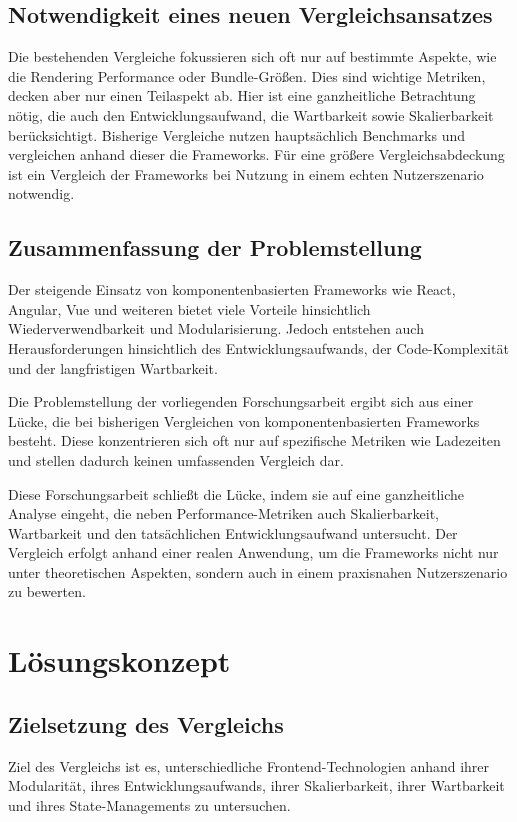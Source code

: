 \documentclass[oneside]{ausarbeitung}
\begin{document}
\section{Notwendigkeit eines neuen Vergleichsansatzes}

Die bestehenden Vergleiche fokussieren sich oft nur auf bestimmte Aspekte, wie die Rendering Performance oder Bundle-Größen. Dies sind wichtige Metriken, decken aber nur einen Teilaspekt ab. Hier ist eine ganzheitliche Betrachtung nötig, die auch den Entwicklungsaufwand, die Wartbarkeit sowie Skalierbarkeit berücksichtigt. Bisherige Vergleiche nutzen hauptsächlich Benchmarks und vergleichen anhand dieser die Frameworks. Für eine größere Vergleichsabdeckung ist ein Vergleich der Frameworks bei Nutzung in einem echten Nutzerszenario notwendig. 

\section{Zusammenfassung der Problemstellung}
Der steigende Einsatz von komponentenbasierten Frameworks wie React, Angular, Vue und weiteren bietet viele Vorteile hinsichtlich Wiederverwendbarkeit und Modularisierung. Jedoch entstehen auch Herausforderungen hinsichtlich des Entwicklungsaufwands, der Code-Komplexität und der langfristigen Wartbarkeit.

Die Problemstellung der vorliegenden Forschungsarbeit ergibt sich aus einer Lücke, die bei bisherigen Vergleichen von komponentenbasierten Frameworks besteht. Diese konzentrieren sich oft nur auf spezifische Metriken wie Ladezeiten und stellen dadurch keinen umfassenden Vergleich dar.

Diese Forschungsarbeit schließt die Lücke, indem sie auf eine ganzheitliche Analyse eingeht, die neben Performance-Metriken auch Skalierbarkeit, Wartbarkeit und den tatsächlichen Entwicklungsaufwand untersucht. Der Vergleich erfolgt anhand einer realen Anwendung, um die Frameworks nicht nur unter theoretischen Aspekten, sondern auch in einem praxisnahen Nutzerszenario zu bewerten.

\chapter{Lösungskonzept}
\label{cha:loesungskonzept}

\section{Zielsetzung des Vergleichs}
Ziel des Vergleichs ist es, unterschiedliche Frontend-Technologien anhand ihrer Modularität, ihres Entwicklungsaufwands, ihrer Skalierbarkeit, ihrer Wartbarkeit und ihres State-Managements zu untersuchen.
\end{document}
